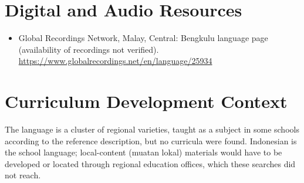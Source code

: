 \documentclass[12pt]{article}
\begin{document}
\section{Digital and Audio Resources}
\begin{itemize}
\item Global Recordings Network, Malay, Central: Bengkulu language page (availability of recordings not verified). \url{https://www.globalrecordings.net/en/language/25934}
\end{itemize}

\section{Curriculum Development Context}
The language is a cluster of regional varieties, taught as a subject in some schools according to the reference description, but no curricula were found. Indonesian is the school language; local-content (muatan lokal) materials would have to be developed or located through regional education offices, which these searches did not reach.
\end{document}
